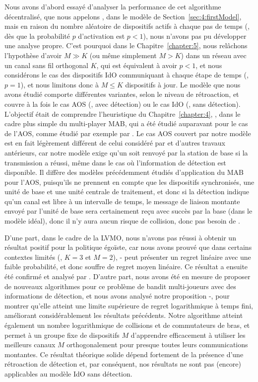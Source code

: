 \begin{resume_fr}
Nous avons d'abord essayé d'analyser la performance de cet algorithme décentralisé, que nous appelons \Selfish, dans le modèle de Section~\ref{sec:4:firstModel},
mais en raison du nombre aléatoire de dispositifs actifs à chaque pas de temps (\ie, dès que la probabilité $p$ d'activation est $p < 1$), nous n'avons pas pu développer une analyse propre.
%
C'est pourquoi dans le Chapitre~\ref{chapter:5}, nous relâchons l'hypothèse d'avoir $M \gg K$ (ou même simplement $M > K$) dans un réseau avec un canal sans fil orthogonal $K$, qui est équivalent à avoir $p < 1$, et nous considérons le cas des dispositifs IdO communiquant à chaque étape de temps (\ie, $p=1$), et nous limitons donc à $M \leq K$ dispositifs à jour.
Le modèle que nous avons étudié comporte différentes variantes, selon le niveau de rétroaction, et couvre à la fois le cas AOS (\ie, avec détection) ou le cas IdO (\ie, sans détection).
L'objectif était de comprendre l'heuristique du Chapitre~\ref{chapter:4}, \Selfish, dans le cadre plus simple du multi-player MAB, qui a été étudié auparavant pour le cas de l'AOS, comme étudié par exemple par \cite{Zhao10,Anandkumar10,Anandkumar11}.
%
Le cas AOS couvert par notre modèle est en fait légèrement différent de celui considéré par \cite{Jouini10} et d'autres travaux antérieurs,
car notre modèle exige qu'un \Ack{} soit renvoyé par la station de base si la transmission a réussi, même dans le cas où l'information de détection est disponible.
Il diffère des modèles précédemment étudiés d'application du MAB pour l'AOS, puisqu'ils ne prennent en compte que les dispositifs synchronisés, une unité de base et une unité centrale de traitement, et donc si la détection indique qu'un canal est libre à un intervalle de temps, le message de liaison montante envoyé par l'unité de base sera certainement reçu avec succès par la base (dans le modèle idéal), donc il n'y aura aucun risque de collision, donc pas besoin de \Ack.


D'une part, dans le cadre de la LVMO, nous n'avons pas réussi à obtenir un résultat positif pour la politique égoïste, car nous avons prouvé que dans certains contextes limités (\eg, $K=3$ et $M=2$), \Selfish-\UCB{} peut présenter un regret linéaire avec une faible probabilité, et donc souffre de regret moyen linéaire.
Ce résultat a ensuite été confirmé et analysé par \cite{BoursierPerchet18}.
%
D'autre part, nous avons été en mesure de proposer de nouveaux algorithmes pour ce problème de bandit multi-joueurs avec des informations de détection, et nous avons analysé notre proposition \MCTopM-\klUCB, pour montrer qu'elle atteint une limite supérieure de regret logarithmique à temps fini, améliorant considérablement les résultats précédents.
Notre algorithme atteint également un nombre logarithmique de collisions et de commutateurs de bras, et permet à un groupe fixe de dispositifs $M$ d'apprendre efficacement à utiliser les meilleurs canaux $M$ orthogonalement pour presque toutes leurs communications montantes.
%
Ce résultat théorique solide dépend fortement de la présence d'une rétroaction de détection et, par conséquent, nos résultats ne sont pas (encore) applicables au modèle IdO sans détection.



\end{resume_fr}
